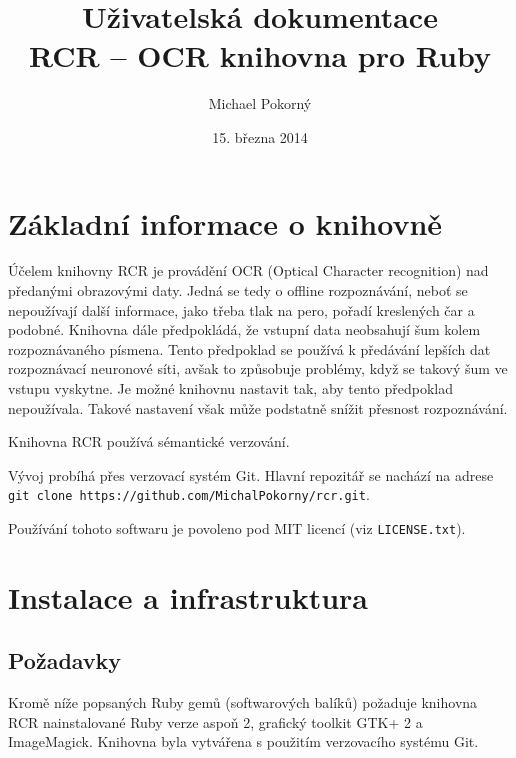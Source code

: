 \documentclass[a4paper]{article}
\def\datum{15. března 2014}
\def\githuburl{git clone https://github.com/MichalPokorny/rcr.git}
\begin{document}
\title{Uživatelská dokumentace \\ RCR -- OCR knihovna pro Ruby}
\author{Michael Pokorný}
\date{\datum}

\maketitle

\tableofcontents

\section{Základní informace o knihovně}
Účelem knihovny RCR je provádění OCR (Optical Character recognition) nad
předanými obrazovými daty. Jedná se tedy o offline rozpoznávání, neboť
se nepoužívají další informace, jako třeba tlak na pero, pořadí kreslených
čar a podobné. Knihovna dále předpokládá, že vstupní data neobsahují
šum kolem rozpoznávaného písmena. Tento předpoklad se používá k předávání
lepších dat rozpoznávací neuronové síti, avšak to způsobuje problémy,
když se takový šum ve vstupu vyskytne. Je možné knihovnu nastavit tak, aby
tento předpoklad nepoužívala. Takové nastavení však může podstatně snížit
přesnost rozpoznávání.

Knihovna RCR používá sémantické verzování.

Vývoj probíhá přes verzovací systém Git. Hlavní repozitář se nachází
na adrese \texttt{\githuburl}.

Používání tohoto softwaru je povoleno pod MIT licencí (viz \texttt{LICENSE.txt}).

\section{Instalace a infrastruktura}
\subsection{Požadavky}
Kromě níže popsaných Ruby gemů (softwarových balíků) požaduje knihovna RCR
nainstalované Ruby verze aspoň 2, grafický toolkit GTK+ 2 a ImageMagick.
Knihovna byla vytvářena s použitím verzovacího systému Git.
\end{document}
